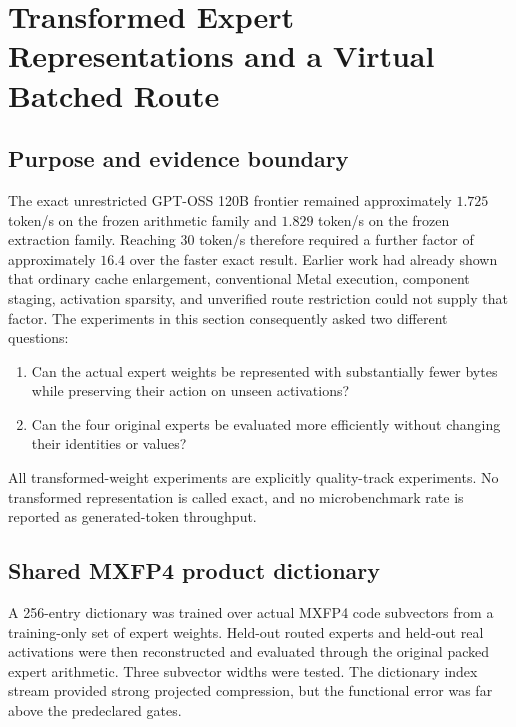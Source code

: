 
\section{Transformed Expert Representations and a Virtual Batched Route}
\label{sec:gptoss120b-transformed-representation-batched-route}

\subsection{Purpose and evidence boundary}

The exact unrestricted GPT-OSS 120B frontier remained approximately
$1.725$ token/s on the frozen arithmetic family and $1.829$ token/s on the
frozen extraction family.  Reaching 30 token/s therefore required a further
factor of approximately $16.4$ over the faster exact result.  Earlier work had
already shown that ordinary cache enlargement, conventional Metal execution,
component staging, activation sparsity, and unverified route restriction could
not supply that factor.  The experiments in this section consequently asked
two different questions:

\begin{enumerate}
  \item Can the actual expert weights be represented with substantially fewer
        bytes while preserving their action on unseen activations?
  \item Can the four original experts be evaluated more efficiently without
        changing their identities or values?
\end{enumerate}

All transformed-weight experiments are explicitly quality-track experiments.
No transformed representation is called exact, and no microbenchmark rate is
reported as generated-token throughput.

\subsection{Shared MXFP4 product dictionary}

A 256-entry dictionary was trained over actual MXFP4 code subvectors from a
training-only set of expert weights.  Held-out routed experts and held-out real
activations were then reconstructed and evaluated through the original packed
expert arithmetic.  Three subvector widths were tested.  The dictionary index
stream provided strong projected compression, but the functional error was far
above the predeclared gates.

